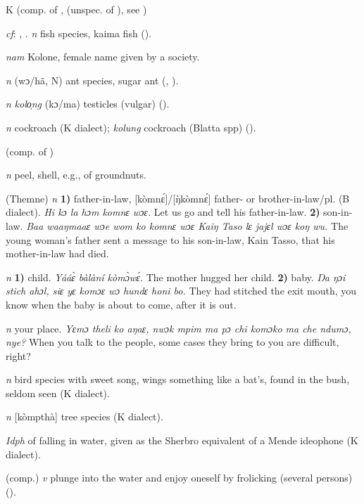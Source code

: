 \begin{letter}{K}
 (comp. of ,  (unspec. of ), see ) 

 \textit{cf}: , . \textit{n} fish species, kaima fish (\citealt{Pichl1967}). 

 \textit{nam} Kolone, female name given by a society. 

 \textit{n} (wɔ/hã, N) ant species, sugar ant (\citealt{Pichl1967}, \citealt{Sumner1921}). 

 \textit{n} \textit{kolo̹ng} (kɔ/ma) testicles (vulgar) (\citealt{Pichl1967}). 

 \textit{n} cockroach (K dialect); \textit{kolung} cockroach (Blatta spp) (\citealt{Pichl1967}). 

 (comp. of ) 

 \textit{n} peel, shell, e.g., of groundnuts. 

 (Themne) \textit{n} \textbf{1)} father-in-law, [kòmnɛ́]/[\`{ŋ}kòmnɛ́] father- or brother-in-law/pl. (B dialect). \textit{Hi kɔ la hɔm komnɛ wɔɛ.} Let us go and tell his father-in-law. \textbf{2)} son-in-law. \textit{Baa waaŋmaaɛ wɔe wom ko komnɛ wɔɛ Kaiŋ Taso lɛ jajɛl wɔɛ koŋ wu.} The young woman's father sent a message to his son-in-law, Kain Tasso, that his mother-in-law had died.

 \textit{n} \textbf{1)} child. \textit{Yááɛ̀ bàlàní kòmɔ̀wɛ́.} The mother hugged her child. \textbf{2)} baby. \textit{Ŋa ŋɔi stich ahɔl, siɛ yɛ komɔɛ wɔ hundɛ honi bo.} They had stitched the exit mouth, you know when the baby is about to come, after it is out.

 \textit{n} your place. \textit{Yɛmɔ theli ko aŋaɛ, nwɔk mpim ma pɔ chi komɔko ma che ndumɔ, nye?} When you talk to the people, some cases they bring to you are difficult, right?

 \textit{n} bird species with sweet song, wings something like a bat's, found in the bush, seldom seen (K dialect). 

 \textit{n} [kòmpthà] tree species (K dialect). 

 \textit{Idph} of falling in water, given as the Sherbro equivalent of a Mende ideophone (K dialect). 

 (comp.) \textit{v} plunge into the water and enjoy oneself by frolicking (several persons) (\citealt{Pichl1967}). 


\end{letter}
